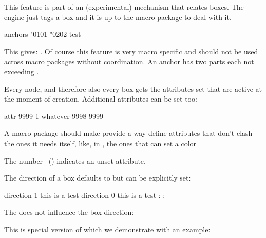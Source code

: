 \startnewprimitive[title={\prm {boxanchors}}]

This feature is part of an (experimental) mechanism that relates boxes. The
engine just tags a box and it is up to the macro package to deal with it.

\startbuffer
{}\hbox anchors "0101 "0202 {test}\tohexadecimal{}
\stopbuffer

\typebuffer

This gives: \inlinebuffer. Of course this feature is very macro specific and
should not be used across macro packages without coordination. An anchor has
two parts each not exceeding .

\stopnewprimitive

\startnewprimitive[title={\prm {boxattribute}}]

Every node, and therefore also every box gets the attributes set that are
active at the moment of creation. Additional attributes can be set too:

\startbuffer
\darkred
{}\hbox attr 9999 1 {whatever}
\the{} 
\the{} 9998
\the{} 9999
\stopbuffer

\typebuffer

A macro package should make provide a way define attributes that don't clash the
ones it needs itself, like, in \CONTEXT, the ones that can set a color

\startlines \getbuffer \stoplines

The number \the\attributeunsetvalue\ (\tohexadecimal\attributeunsetvalue)
indicates an unset attribute.

\stopnewprimitive

\startnewprimitive[title={\prm {boxdirection}}]

The direction of a box defaults to  but can be explicitly set:

\startbuffer
{}\hbox direction 1 {this is a test}
\hbox direction 0 {this is a test}
\the{}: 
\the{}: 
\stopbuffer

\typebuffer

The  does not influence the box direction:

\startlines \getbuffer \stoplines

\stopnewprimitive

\startnewprimitive[title={\prm {boxfinalize}}]

This is special version of  which we demonstrate
with an example:

